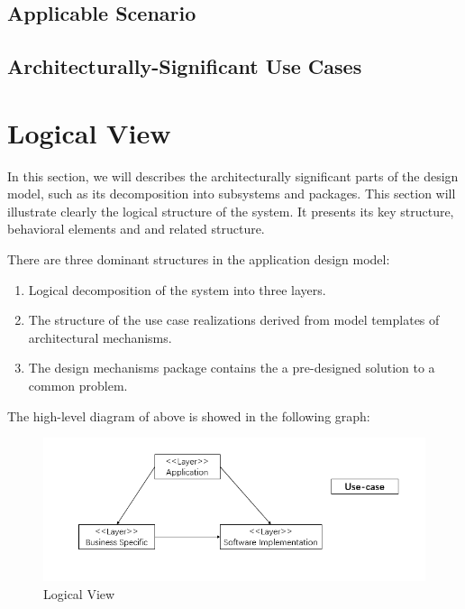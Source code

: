\documentclass[12pt]{article}
\begin{document}
\subsection{Applicable Scenario}
\subsection{Architecturally-Significant Use Cases}

\section{Logical View}
\qquad In this section, we will describes the architecturally significant parts of the design model, such as its decomposition into subsystems and packages. This section will illustrate clearly the logical structure of the system. It presents its key structure, behavioral elements and and related structure.

There are three dominant structures in the application design model:
\begin{enumerate}
	\item Logical decomposition of the system into three layers.
	\item The structure of the use case realizations derived from model templates of architectural mechanisms.
	\item The design mechanisms package contains the a pre-designed solution to a common problem. 
\end{enumerate}

The high-level diagram of above is showed in the following graph:
\begin{figure}[H]
	\centering
	\includegraphics[width=1.0\linewidth]{logical.jpg}
	\caption{Logical View}
\end{figure}
\end{document}
